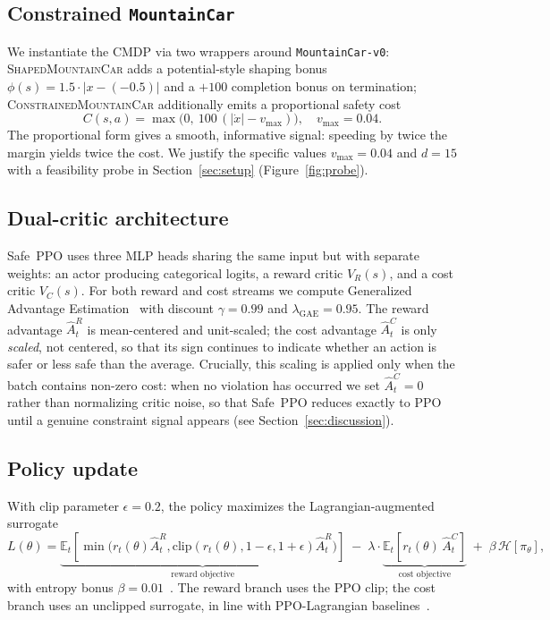 \documentclass{article}
\newcommand{\figref}[1]{Figure~\ref{#1}}
\newcommand{\secref}[1]{Section~\ref{#1}}
\begin{document}
\subsection{Constrained \texttt{MountainCar}}
We instantiate the CMDP via two wrappers around \texttt{MountainCar-v0}:
\textsc{ShapedMountainCar} adds a potential-style shaping bonus
$\phi(s) = 1.5 \cdot |x - (-0.5)|$ and a $+100$ completion bonus on termination;
\textsc{ConstrainedMountainCar} additionally emits a proportional safety cost
\begin{equation}
\label{eq:cost}
C(s, a) = \max\!\bigl(0,\ 100\,(|\dot{x}| - v_{\max})\bigr), \quad v_{\max} = 0.04.
\end{equation}
The proportional form gives a smooth, informative signal: speeding by twice the margin yields
twice the cost. We justify the specific values $v_{\max}{=}0.04$ and $d{=}15$ with a feasibility probe in \secref{sec:setup} (\figref{fig:probe}).

\subsection{Dual-critic architecture}
Safe~PPO uses three MLP heads sharing the same input but with separate weights:
an actor producing categorical logits, a reward critic $V_R(s)$, and a cost critic $V_C(s)$.
For both reward and cost streams we compute Generalized Advantage Estimation~\citep{schulman2016gae} with discount $\gamma{=}0.99$ and $\lambda_{\text{GAE}}{=}0.95$.
The reward advantage $\hat{A}_t^R$ is mean-centered and unit-scaled; the cost advantage
$\hat{A}_t^C$ is only \emph{scaled}, not centered, so that its sign continues to indicate
whether an action is safer or less safe than the average. Crucially, this scaling is applied
only when the batch contains non-zero cost: when no violation has occurred we set
$\hat{A}_t^C{=}0$ rather than normalizing critic noise, so that Safe~PPO reduces exactly to PPO
until a genuine constraint signal appears (see \secref{sec:discussion}).

\subsection{Policy update}
With clip parameter $\epsilon = 0.2$, the policy maximizes the Lagrangian-augmented surrogate
\begin{equation}
\label{eq:safeppo}
L(\theta) =
\underbrace{\mathbb{E}_t\!\left[ \min\bigl(r_t(\theta)\hat{A}^R_t, \mathrm{clip}(r_t(\theta), 1\!-\!\epsilon, 1\!+\!\epsilon)\hat{A}^R_t\bigr)\right]}_{\text{reward objective}}
\;-\;
\lambda \cdot
\underbrace{\mathbb{E}_t\!\left[ r_t(\theta)\,\hat{A}^C_t \right]}_{\text{cost objective}}
\;+\; \beta\,\mathcal{H}[\pi_\theta],
\end{equation}
with entropy bonus $\beta{=}0.01$~\citep{mnih2016a3c}. The reward branch uses the PPO clip; the cost branch uses an
unclipped surrogate, in line with PPO-Lagrangian baselines~\citep{ray2019benchmarking}.
\end{document}
